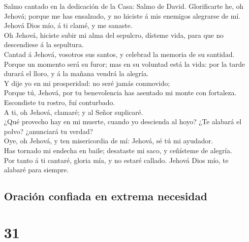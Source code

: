  Salmo cantado en la dedicación de la Casa: Salmo de
David. Glorificarte he, oh Jehová; porque me has ensalzado, y no hiciste
á mis enemigos alegrarse de mí.\\
 Jehová Dios mío, á ti clamé, y me sanaste.\\
 Oh Jehová, hiciste subir mi alma del sepulcro, dísteme
vida, para que no descendiese á la sepultura.\\
 Cantad á Jehová, vosotros sus santos, y celebrad la
memoria de su santidad.\\
 Porque un momento será su furor; mas en su voluntad está
la vida: por la tarde durará el lloro, y á la mañana vendrá la
alegría.\\
 Y dije yo en mi prosperidad: no seré jamás conmovido;\\
 Porque tú, Jehová, por tu benevolencia has asentado mi
monte con fortaleza. Escondiste tu rostro, fuí conturbado.\\
 A ti, oh Jehová, clamaré; y al Señor suplicaré.\\
 ¿Qué provecho hay en mi muerte, cuando yo descienda al
hoyo? ¿Te alabará el polvo? ¿anunciará tu verdad?\\
 Oye, oh Jehová, y ten misericordia de mí: Jehová, sé tú
mi ayudador.\\
 Has tornado mi endecha en baile; desataste mi saco, y
ceñísteme de alegría.\\
 Por tanto á ti cantaré, gloria mía, y no estaré callado.
Jehová Dios mío, te alabaré para siempre.

\hypertarget{oraciuxf3n-confiada-en-extrema-necesidad}{%
\subsection{Oración confiada en extrema
necesidad}\label{oraciuxf3n-confiada-en-extrema-necesidad}}

\hypertarget{section-19-31}{%
\section{31}\label{section-19-31}}

